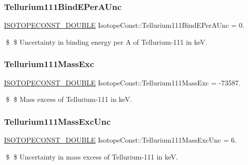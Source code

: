 \subsubsection{\texorpdfstring{Tellurium111\+Bind\+E\+Per\+A\+Unc}{Tellurium111BindEPerAUnc}}
{\footnotesize\ttfamily \mbox{\hyperlink{group___isotope_const-_macros_ga8f45a7272ce02c0b4c65c44636ed719a}{I\+S\+O\+T\+O\+P\+E\+C\+O\+N\+S\+T\+\_\+\+D\+O\+U\+B\+LE}} Isotope\+Const\+::\+Tellurium111\+Bind\+E\+Per\+A\+Unc = 0.}

\$ \$ Uncertainty in binding energy per A of Tellurium-\/111 in keV. \mbox{\label{group___isotope_const-_tellurium-_te111_ga5126306a498fe6717877bcd313a8e3f5}} 
\subsubsection{\texorpdfstring{Tellurium111\+Mass\+Exc}{Tellurium111MassExc}}
{\footnotesize\ttfamily \mbox{\hyperlink{group___isotope_const-_macros_ga8f45a7272ce02c0b4c65c44636ed719a}{I\+S\+O\+T\+O\+P\+E\+C\+O\+N\+S\+T\+\_\+\+D\+O\+U\+B\+LE}} Isotope\+Const\+::\+Tellurium111\+Mass\+Exc = -\/73587.}

\$ \$ Mass excess of Tellurium-\/111 in keV. \mbox{\label{group___isotope_const-_tellurium-_te111_gad03802add4248f9bb3a12085df63302e}} 
\subsubsection{\texorpdfstring{Tellurium111\+Mass\+Exc\+Unc}{Tellurium111MassExcUnc}}
{\footnotesize\ttfamily \mbox{\hyperlink{group___isotope_const-_macros_ga8f45a7272ce02c0b4c65c44636ed719a}{I\+S\+O\+T\+O\+P\+E\+C\+O\+N\+S\+T\+\_\+\+D\+O\+U\+B\+LE}} Isotope\+Const\+::\+Tellurium111\+Mass\+Exc\+Unc = 6.}

\$ \$ Uncertainty in mass excess of Tellurium-\/111 in keV. \mbox{\label{group___isotope_const-_tellurium-_te111_gad912eefae7c652df4b2d97da394f132a}} 
